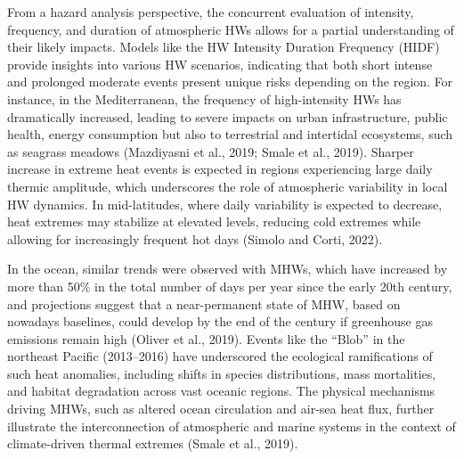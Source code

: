 \documentclass[
  letterpaper,
  11pt,
  english,
  singlespacing,
  headsepline]{MastersDoctoralThesis}
\begin{document}
\begin{spacing}{1.5}
From a hazard analysis perspective, the concurrent evaluation of
intensity, frequency, and duration of atmospheric HWs allows for a
partial understanding of their likely impacts. Models like the HW
Intensity Duration Frequency (HIDF) provide insights into various HW
scenarios, indicating that both short intense and prolonged moderate
events present unique risks depending on the region. For instance, in
the Mediterranean, the frequency of high-intensity HWs has dramatically
increased, leading to severe impacts on urban infrastructure, public
health, energy consumption but also to terrestrial and intertidal
ecosystems, such as seagrass meadows (Mazdiyasni et al., 2019; Smale et
al., 2019). Sharper increase in extreme heat events is expected in
regions experiencing large daily thermic amplitude, which underscores
the role of atmospheric variability in local HW dynamics. In
mid-latitudes, where daily variability is expected to decrease, heat
extremes may stabilize at elevated levels, reducing cold extremes while
allowing for increasingly frequent hot days (Simolo and Corti, 2022).

In the ocean, similar trends were observed with MHWs, which have
increased by more than 50\% in the total number of days per year since
the early 20th century, and projections suggest that a near-permanent
state of MHW, based on nowadays baselines, could develop by the end of
the century if greenhouse gas emissions remain high (Oliver et al.,
2019). Events like the ``Blob'' in the northeast Pacific (2013--2016)
have underscored the ecological ramifications of such heat anomalies,
including shifts in species distributions, mass mortalities, and habitat
degradation across vast oceanic regions. The physical mechanisms driving
MHWs, such as altered ocean circulation and air-sea heat flux, further
illustrate the interconnection of atmospheric and marine systems in the
context of climate-driven thermal extremes (Smale et al., 2019).


\end{spacing}
\end{document}
